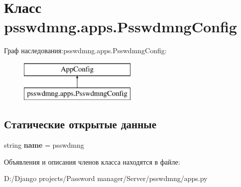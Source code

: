 \section{Класс psswdmng.\+apps.\+Psswdmng\+Config}
\label{classpsswdmng_1_1apps_1_1_psswdmng_config}
Граф наследования\+:psswdmng.\+apps.\+Psswdmng\+Config\+:\begin{figure}[H]
\begin{center}
\leavevmode
\includegraphics[height=2.000000cm]{classpsswdmng_1_1apps_1_1_psswdmng_config}
\end{center}
\end{figure}
\subsection*{Статические открытые данные}
\begin{DoxyCompactItemize}
\item 
\mbox{\label{classpsswdmng_1_1apps_1_1_psswdmng_config_a685d761ace1e2daa1248b1234ecb4a3c}} 
string {\bfseries name} = \textquotesingle{}psswdmng\textquotesingle{}
\end{DoxyCompactItemize}


Объявления и описания членов класса находятся в файле\+:\begin{DoxyCompactItemize}
\item 
D\+:/\+Django projects/\+Password manager/\+Server/psswdmng/apps.\+py\end{DoxyCompactItemize}
